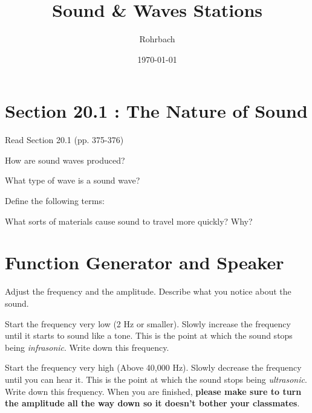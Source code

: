\documentclass[10pt]{exam}
\title{Sound \& Waves Stations}
\author{Rohrbach}
\date{\today}
\begin{document}
\maketitle

\section{Section 20.1 : The Nature of Sound}

Read Section 20.1 (pp. 375-376)

\begin{questions}
  \question 
    How are sound waves produced? \vs

  \question 
    What type of wave is a sound wave? \vs

  \question 
    Define the following terms:


  \question 
    What sorts of materials cause sound to travel more quickly?  Why? \vs

\end{questions}

\section{Function Generator and Speaker}

\begin{questions}
  \question
    Adjust the frequency and the amplitude.  Describe what you notice about the sound. \vs

  \question
    Start the frequency very low (2 Hz or smaller).  Slowly increase the frequency until it starts to sound like a tone.  This is the point at which the sound stops being \emph{infrasonic}.  Write down this frequency. \vs


  \question
    Start the frequency very high (Above 40,000 Hz).  Slowly decrease the frequency until you can hear it.  This is the point at which the sound stops being \emph{ultrasonic}.  Write down this frequency.  When you are finished, {\bf please make sure to turn the amplitude all the way down so it doesn't bother your classmates}. \vs

\end{questions}
\end{document}
